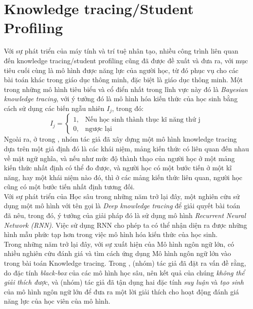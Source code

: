\section{Knowledge tracing/Student Profiling}
Với sự phát triển của máy tính và trí tuệ nhân tạo, nhiều công trình liên quan đến knowledge tracing/student profiling cũng đã được đề xuất và đưa ra, với mục tiêu cuối cùng là mô hình được năng lực của người học, từ đó phục vụ cho các bài toán khác trong giáo dục thông minh, đặc biệt là giáo dục thông minh. Một trong những mô hình tiêu biểu và cổ điển nhất trong lĩnh vực này đó là \emph{Bayesian knowledge tracing}, với ý tưởng đó là mô hình hóa kiến thức của học sinh bằng cách sử dụng các biến ngẫu nhiên $I_j$, trong đó:
\begin{equation}
  I_{j} = \begin{cases}
    1, & \text{Nếu học sinh thành thục kĩ năng thứ j} \\
    0, & \text{ngược lại}
  \end{cases} \label{eq:indicator}
\end{equation}
 Ngoài ra, ở trong \cite{cross_modal_2021}, nhóm tác giả đã xây dựng một mô hình knowledge tracing dựa trên một giả định đó là các khái niệm, mảng kiến thức có liên quan đến nhau về mặt ngữ nghĩa, và nếu như mức độ thành thạo của người học ở một mảng kiến thức nhất định có thể đo được, và người học có một bước tiến ở một kĩ năng, hay một khái niệm nào đó, thì ở các mảng kiến thức liên quan, người học cũng có một bước tiến nhất định tương đối.\\
Với sự phát triển của Học sâu trong những năm trở lại đây, một nghiên cứu sử dụng một mô hình với tên gọi là \emph{Deep knowledge tracing} \cite{10.5555/2969239.2969296} để giải quyết bài toán đã nêu, trong đó, ý tưởng của giải pháp đó là sử dụng mô hình \emph{Recurrent Neural Network (RNN)}. Việc sử dụng RNN cho phép ta có thể nhận diện ra được những hình mẫu phức tạp hơn trong việc mô hình hóa kiến thức của học sinh.\\
Trong những năm trở lại đây, với sự xuất hiện của Mô hình ngôn ngữ lớn, có nhiều nghiên cứu đánh giá và tìm cách ứng dụng Mô hình ngôn ngữ lớn vào trong bài toán Knowledge tracing. Trong \cite{li2024explainable}, (nhóm) tác giả đã đặt ra vấn đề rằng, do đặc tính \emph{black-box} của các mô hình học sâu, nên kết quả của chúng \emph{không thể giải thích được}, và (nhóm) tác giả đã tận dụng hai đặc tính \emph{suy luận} và  \emph{tạo sinh} của mô hình ngôn ngữ lớn để đưa ra một lời giải thích cho hoạt động đánh giá năng lực của học viên của mô hình.

